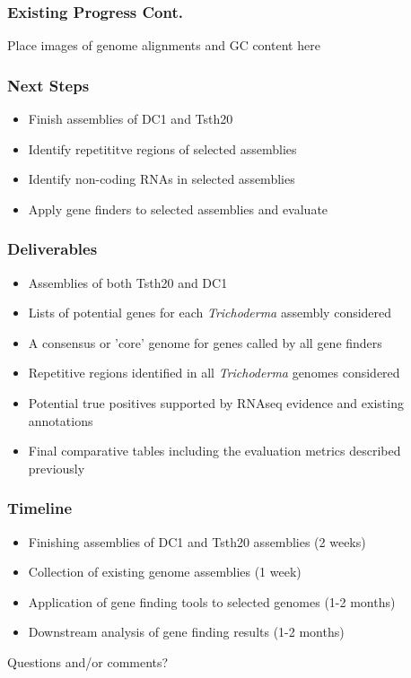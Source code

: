 \documentclass{beamer}
\begin{document}
\begin{frame}
  \frametitle{Existing Progress Cont.}
  Place images of genome alignments and GC content here
\end{frame}

\begin{frame}
  \frametitle{Next Steps}
  \begin{itemize}
  \item Finish assemblies of DC1 and Tsth20
  \item Identify repetititve regions of selected assemblies
  \item Identify non-coding RNAs in selected assemblies
  \item Apply gene finders to selected assemblies and evaluate
  \end{itemize}
\end{frame}

\begin{frame}
  \frametitle{Deliverables}
  \begin{itemize}
  \item Assemblies of both Tsth20 and DC1
  \item Lists of potential genes for each \textit{Trichoderma}
    assembly considered
  \item A consensus or 'core' genome for genes called by all gene
    finders
  \item Repetitive regions identified in all \textit{Trichoderma}
    genomes considered
  \item Potential true positives supported by RNAseq evidence and
    existing annotations
  \item Final comparative tables including the evaluation metrics
    described previously
  \end{itemize}
\end{frame}

\begin{frame}
  \frametitle{Timeline}
  \begin{itemize}
  \item Finishing assemblies of DC1 and Tsth20 assemblies (2 weeks)
  \item Collection of existing genome assemblies (1 week)
  \item Application of gene finding tools to selected genomes (1-2
    months)
  \item Downstream analysis of gene finding results (1-2 months)
  \end{itemize}
\end{frame}

\begin{frame}
  \begin{center}
    Questions and/or comments?
  \end{center}
\end{frame}
\end{document}
